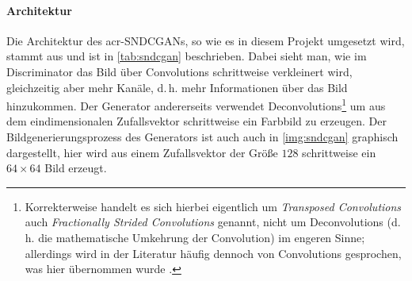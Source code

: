 \paragraph{Architektur} Die Architektur des \gls{acr-SNDCGAN}s, so wie es in
diesem Projekt umgesetzt wird, stammt aus 
\cite{kurach2018gan} und ist in \cref{tab:sndcgan} beschrieben. Dabei sieht man,
wie im Discriminator das Bild über Convolutions schrittweise verkleinert wird,
gleichzeitig aber mehr Kanäle, d.\,h. mehr Informationen über das Bild
hinzukommen. Der Generator andererseits verwendet
Deconvolutions\footnote{Korrekterweise handelt es sich hierbei eigentlich um
\emph{Transposed Convolutions} auch \emph{Fractionally Strided Convolutions}
genannt, nicht um Deconvolutions (d.\,h. die mathematische Umkehrung der
Convolution) im engeren Sinne; allerdings wird in der Literatur häufig dennoch
von Convolutions gesprochen, was hier übernommen wurde \cites[vgl.][S.
20]{dumoulin2016guide}[vgl.][S. 4]{radford2015unsupervised}.} um aus dem
eindimensionalen Zufallsvektor schrittweise ein Farbbild zu erzeugen. Der
Bildgenerierungsprozess des Generators ist auch auch in \cref{img:sndcgan}
graphisch dargestellt, hier wird aus einem Zufallsvektor der Größe $128$
schrittweise ein $64 \times 64$ Bild erzeugt.

